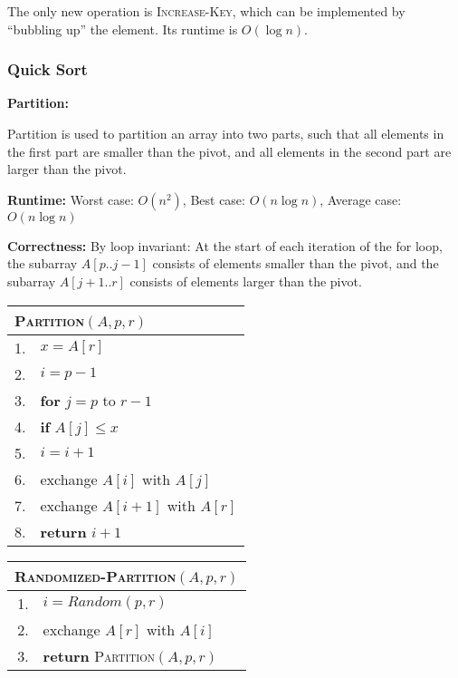 \documentclass[a4paper,12pt]{article}
\begin{document}
The only new operation is \textsc{Increase-Key}, which can be implemented by ``bubbling up'' the element.
Its runtime is $O(\log n)$.

\subsubsection{Quick Sort}

\textbf{Partition:}

Partition is used to partition an array into two parts, such that all elements in the first part are smaller than the pivot, and all elements in the second part are larger than the pivot.

\textbf{Runtime:} 
Worst case: $O(n^2)$, Best case: $O(n \log n)$, Average case: $O(n \log n)$

\textbf{Correctness:} 
By loop invariant: 
At the start of each iteration of the for loop, the subarray $A[p..j - 1]$ consists of elements smaller than the pivot, and the subarray $A[j + 1..r]$ consists of elements larger than the pivot.

\begin{center}
	\begin{tabular}{rl}
		\toprule
		\multicolumn{2}{l}{\textsc{Partition}$(A, p, r)$} \\
		\midrule
		1. & $x = A[r]$ \\
		2. & $i = p - 1$ \\
		3. & \textbf{for} $j = p$ to $r - 1$ \\
		4. & \quad \textbf{if} $A[j] \leq x$ \\
		5. & \quad \quad $i = i + 1$ \\
		6. & \quad \quad exchange $A[i]$ with $A[j]$ \\
		7. & exchange $A[i + 1]$ with $A[r]$ \\
		8. & \textbf{return} $i + 1$ \\
		\bottomrule
	\end{tabular}
\end{center}

\begin{center}
	\begin{tabular}{rl}
		\toprule
		\multicolumn{2}{l}{\textsc{Randomized-Partition}$(A, p, r)$} \\
		\midrule
		1. & $i = Random(p, r)$ \\
		2. & exchange $A[r]$ with $A[i]$ \\
		3. & \textbf{return} \textsc{Partition}$(A, p, r)$ \\
		\bottomrule
	\end{tabular}
\end{center}
\end{document}
